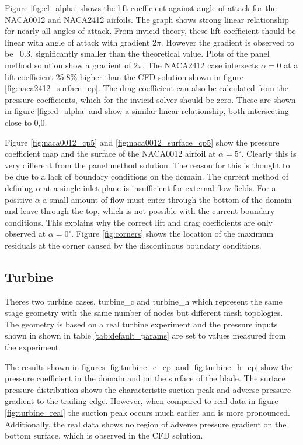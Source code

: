 \documentclass{article}
\begin{document}
Figure \ref{fig:cl_alpha} shows the lift coefficient against angle of attack for the NACA0012 and NACA2412 airfoils.
The graph shows strong linear relationship for nearly all angles of attack.
From invicid theory, these lift coefficient should be linear with angle of attack with gradient $ 2\pi $.
However the gradient is observed to be ~0.3, significantly smaller than the theoretical value.
Plots of the panel method solution show a gradient of $2\pi$. The NACA2412 case intersects $\alpha = 0$ at a lift coefficient 25.8\% higher than the CFD solution shown in figure \ref{fig:naca2412_surface_cp}.
The drag coefficient can also be calculated from the pressure coefficients, which for the invicid solver should be zero.
These are shown in figure \ref{fig:cd_alpha} and show a similar linear relationship, both intersecting close to 0,0.

Figure \ref{fig:naca0012_cp5} and \ref{fig:naca0012_surface_cp5} show the pressure coefficient map and the surface of the NACA0012 airfoil at $\alpha = 5^\circ$.
Clearly this is very different from the panel method solution.
The reason for this is thought to be due to a lack of boundary conditions on the domain.
The current method of defining $\alpha$ at a single inlet plane is insufficient for external flow fields.
For a positive $\alpha$ a small amount of flow must enter through the bottom of the domain and leave through the top, which is not possible with the current boundary conditions.
This explains why the correct lift and drag coefficients are only observed at $\alpha = 0^\circ$.
Figure \ref{fig:corners} shows the location of the maximum residuals at the corner caused by the discontinous boundary conditions.

\subsection{Turbine}

Theres two turbine cases, turbine\_c and turbine\_h which represent the same stage geometry with the same number of nodes but different mesh topologies.
The geometry is based on a real turbine experiment \cite{4A3_lab} and the pressure inputs shown in shown in table \ref{tab:default_params} are set to values measured from the experiment. 

The results shown in figures \ref{fig:turbine_c_cp} and \ref{fig:turbine_h_cp} show the pressure coefficient in the domain and on the surface of the blade.
The surface pressure distribution shows the characteristic suction peak and adverse pressure gradient to the trailing edge.
However, when compared to real data in figure \ref{fig:turbine_real} the suction peak occurs much earlier and is more pronounced.
Additionally, the real data shows no region of adverse pressure gradient on the bottom surface, which is observed in the CFD solution.
\end{document}

